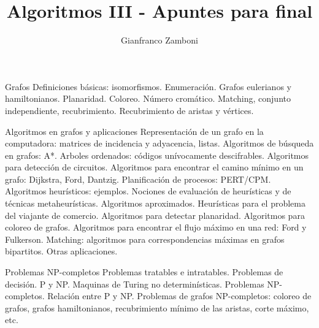 


\title{Algoritmos III - Apuntes para final}
\author{Gianfranco Zamboni}

\usepackage[backend=biber,style=chem-acs,sorting=none]{biblatex}
\nocite{*}




\setcounter{tocdepth}{3}


	
	
	\maketitle
	\tableofcontents

\newpage

\newpage


\newpage


\newpage


\newpage

\color{red}

Grafos Definiciones básicas: isomorfismos. Enumeración. Grafos eulerianos y hamiltonianos. Planaridad. Coloreo. Número cromático. Matching, conjunto independiente, recubrimiento. Recubrimiento de aristas y vértices.
	
Algoritmos en grafos y aplicaciones Representación de un grafo en la computadora: matrices de incidencia y adyacencia, listas. Algoritmos de búsqueda en grafos: A*. Arboles ordenados: códigos unívocamente descifrables. Algoritmos para detección de circuitos. Algoritmos para encontrar el camino mínimo en un grafo: Dijkstra, Ford, Dantzig. Planificación de procesos: PERT/CPM. Algoritmos heurísticos: ejemplos. Nociones de evaluación de heurísticas y de técnicas metaheurísticas. Algoritmos aproximados. Heurísticas para el problema del viajante de comercio. Algoritmos para detectar planaridad. Algoritmos para coloreo de grafos. Algoritmos para encontrar el flujo máximo en una red: Ford y Fulkerson. Matching: algoritmos para correspondencias máximas en grafos bipartitos. Otras aplicaciones.



Problemas NP-completos Problemas tratables e intratables. Problemas de decisión. P y NP. Maquinas de Turing no determinísticas. Problemas NP-completos. Relación entre P y NP. Problemas de grafos NP-completos: coloreo de grafos, grafos hamiltonianos, recubrimiento mínimo de las aristas, corte máximo, etc.


